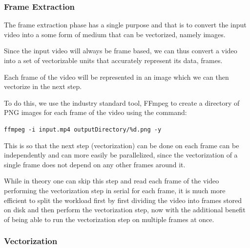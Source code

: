 \documentclass[12pt]{article}
\newcommand{\sentence}{} %
\newcommand{\code}[1]{\texttt{#1}}
\begin{document}
    \subsubsection{Frame Extraction}\label{subsubsec:frame-extraction}

    \tab
    The frame extraction phase has a single purpose and that is to convert the input video into a some form of medium
    that can be vectorized, namely images.
    \sentence
    Since the input video will always be frame based, we can thus convert a video into a set of vectorizable units
    that accurately represent its data, frames.
    \sentence
    Each frame of the video will be represented in an image which we can then vectorize in the next step.
    \sentence
    To do this, we use the industry standard tool, FFmpeg to create a directory of PNG images for each frame of the
    video using the command:
    \begin{center}
        \code{ffmpeg -i input.mp4 outputDirectory/\%d.png -y}
    \end{center}
    \sentence
    This is so that the next step (vectorization) can be done on each frame can be independently and can more easily
    be parallelized, since the vectorization of a single frame does not depend on any other frames around it.
    \sentence
    While in theory one can skip this step and read each frame of the video performing the vectorization step in
    serial for each frame, it is much more efficient to split the workload first by first dividing the video into
    frames stored on disk and then perform the vectorization step, now with the additional benefit of being able to
    run the vectorization step on multiple frames at once.

    \subsubsection{Vectorization}\label{subsubsec:vectorization}
\end{document}
